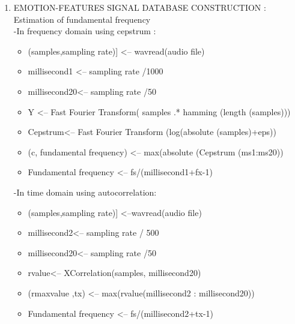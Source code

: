 \documentclass{article}
\begin{document}
\begin{enumerate}
\item EMOTION-FEATURES SIGNAL DATABASE CONSTRUCTION :\\
Estimation of fundamental frequency \\
-In frequency domain using cepstrum :
\begin{itemize}
\item (samples,sampling rate)] <-- wavread(audio file)
\item millisecond1 <-- sampling rate /1000
\item millisecond20<-- sampling rate /50
\item Y <-- Fast Fourier Transform( samples .* hamming (length (samples)))
\item Cepstrum<-- Fast Fourier Transform (log(absolute (samples)+eps))
\item (c, fundamental frequency) <-- max(absolute (Cepstrum (ms1:ms20))
\item Fundamental frequency <-- fs/(millisecond1+fx-1)
\end{itemize}
-In time domain using autocorrelation:
\begin{itemize}
\item (samples,sampling rate)] <--wavread(audio file)
\item millisecond2<-- sampling rate / 500 
\item millisecond20<-- sampling rate /50
\item rvalue<-- XCorrelation(samples, millisecond20)   
\item (rmaxvalue ,tx) <-- max(rvalue(millisecond2 : millisecond20))
\item Fundamental frequency <-- fs/(millisecond2+tx-1)
\end{itemize}


\end{enumerate}
\end{document}
